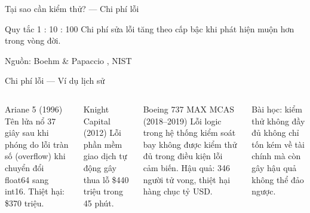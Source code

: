 \documentclass[aspectratio=169,12pt]{beamer}
\begin{document}
\begin{frame}[fragile]{Tại sao cần kiểm thử? --- Chi phí lỗi}
  \begin{block}{Quy tắc 1 : 10 : 100}
    Chi phí sửa lỗi tăng theo cấp bậc khi phát hiện muộn hơn trong vòng đời.
  \end{block}

  \vspace{0.2em}
  \begin{center}
  \end{center}

  \vspace{-0.1em}
  {\small Nguồn: Boehm \& Papaccio \cite{boehm}, NIST \cite{nist}}
\end{frame}

\begin{frame}{Chi phí lỗi --- Ví dụ lịch sử}
  \begin{columns}
    \begin{alertblock}{Ariane 5 (1996)}
      Tên lửa nổ 37 giây sau khi phóng do lỗi tràn số (overflow) khi
      chuyển đổi float64 sang int16. Thiệt hại: \$370 triệu.
    \end{alertblock}

    \begin{alertblock}{Knight Capital (2012)}
      Lỗi phần mềm giao dịch tự động gây thua lỗ \$440 triệu trong 45 phút.
    \end{alertblock}

    \begin{alertblock}{Boeing 737 MAX MCAS (2018--2019)}
      Lỗi logic trong hệ thống kiểm soát bay không được kiểm thử đủ trong
      điều kiện lỗi cảm biến. Hậu quả: 346 người tử vong, thiệt hại hàng
      chục tỷ USD.
    \end{alertblock}

    \vspace{0.3em}
    {\small Bài học: kiểm thử không đầy đủ không chỉ tốn kém về tài chính
    mà còn gây hậu quả không thể đảo ngược.}
  \end{columns}
\end{frame}
\end{document}
